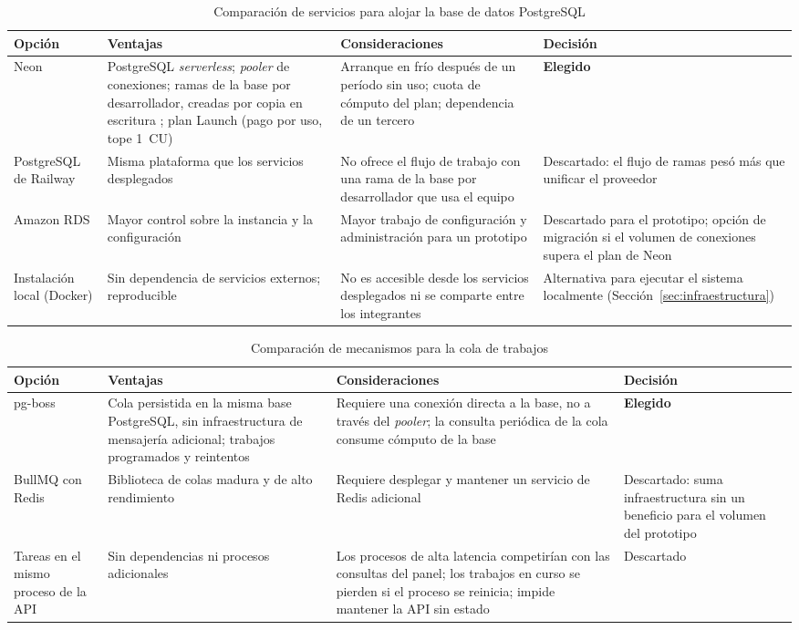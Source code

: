 \begin{table}[h]
\centering
\caption{Comparación de servicios para alojar la base de datos PostgreSQL}
\label{tab:comparativo_bd_nube}
\renewcommand{\arraystretch}{1.3}
\begin{tabular}{|m{2.3cm}|m{4.4cm}|m{4.4cm}|m{3.4cm}|}
\hline
\textbf{Opción} & \textbf{Ventajas} & \textbf{Consideraciones} & \textbf{Decisión} \\
\hline
Neon & PostgreSQL \emph{serverless}; \emph{pooler} de conexiones; ramas de la base por desarrollador, creadas por copia en escritura \parencite{NeonBranching2026}; plan Launch (pago por uso, tope 1~CU) & Arranque en frío después de un período sin uso; cuota de cómputo del plan; dependencia de un tercero & \textbf{Elegido} \\
\hline
PostgreSQL de Railway & Misma plataforma que los servicios desplegados & No ofrece el flujo de trabajo con una rama de la base por desarrollador que usa el equipo & Descartado: el flujo de ramas pesó más que unificar el proveedor \\
\hline
Amazon RDS & Mayor control sobre la instancia y la configuración & Mayor trabajo de configuración y administración para un prototipo & Descartado para el prototipo; opción de migración si el volumen de conexiones supera el plan de Neon \\
\hline
Instalación local (Docker) & Sin dependencia de servicios externos; reproducible & No es accesible desde los servicios desplegados ni se comparte entre los integrantes & Alternativa para ejecutar el sistema localmente (Sección~\ref{sec:infraestructura}) \\
\hline
\end{tabular}
\end{table}

\begin{table}[h]
\centering
\caption{Comparación de mecanismos para la cola de trabajos}
\label{tab:comparativo_cola}
\renewcommand{\arraystretch}{1.3}
\begin{tabular}{|m{2.3cm}|m{4.4cm}|m{4.4cm}|m{3.4cm}|}
\hline
\textbf{Opción} & \textbf{Ventajas} & \textbf{Consideraciones} & \textbf{Decisión} \\
\hline
pg-boss & Cola persistida en la misma base PostgreSQL, sin infraestructura de mensajería adicional; trabajos programados y reintentos & Requiere una conexión directa a la base, no a través del \emph{pooler}; la consulta periódica de la cola consume cómputo de la base & \textbf{Elegido} \\
\hline
BullMQ con Redis & Biblioteca de colas madura y de alto rendimiento & Requiere desplegar y mantener un servicio de Redis adicional & Descartado: suma infraestructura sin un beneficio para el volumen del prototipo \\
\hline
Tareas en el mismo proceso de la API & Sin dependencias ni procesos adicionales & Los procesos de alta latencia competirían con las consultas del panel; los trabajos en curso se pierden si el proceso se reinicia; impide mantener la API sin estado & Descartado \\
\hline
\end{tabular}
\end{table}

